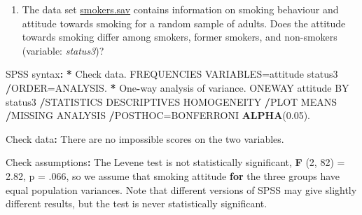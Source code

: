 \documentclass[a4paper]{book}
\newenvironment{Shaded}{\begin{snugshade}}{\end{snugshade}}
\newcommand{\KeywordTok}[1]{\textcolor[rgb]{0,0,0}{\textbf{#1}}}
\newcommand{\DecValTok}[1]{\textcolor[rgb]{0.00,0.00,0.00}{#1}}
\newcommand{\FloatTok}[1]{\textcolor[rgb]{0.00,0.00,0.00}{#1}}
\newcommand{\StringTok}[1]{\textcolor[rgb]{0.00,0.00,0.00}{#1}}
\newcommand{\ControlFlowTok}[1]{\textcolor[rgb]{0.00,0.00,0.00}{\textbf{#1}}}
\newcommand{\OperatorTok}[1]{\textcolor[rgb]{0.00,0.00,0.00}{\textbf{#1}}}
\newcommand{\ErrorTok}[1]{\textcolor[rgb]{0.00,0.00,0.00}{\textbf{#1}}}
\newcommand{\NormalTok}[1]{#1}
\providecommand{\tightlist}{%
  \setlength{\itemsep}{0pt}\setlength{\parskip}{0pt}}
\theoremstyle{definition}
\theoremstyle{definition}
\theoremstyle{definition}
\theoremstyle{remark}
\begin{document}
\begin{enumerate}
\def\labelenumi{\arabic{enumi}.}
\setcounter{enumi}{1}
\tightlist
\item
  The data set
  \href{http://82.196.4.233:3838/data/smokers.sav}{smokers.sav} contains
  information on smoking behaviour and attitude towards smoking for a
  random sample of adults. Does the attitude towards smoking differ
  among smokers, former smokers, and non-smokers (variable:
  \emph{status3})?
\end{enumerate}

\begin{Shaded}
\begin{Highlighting}[]
\NormalTok{SPSS syntax}\OperatorTok{:}\StringTok{  }
\StringTok{  }
\ErrorTok{*}\StringTok{ }\NormalTok{Check data.  }
\NormalTok{FREQUENCIES VARIABLES=attitude status3  }
  \OperatorTok{/}\NormalTok{ORDER=ANALYSIS.  }
\OperatorTok{*}\StringTok{ }\NormalTok{One}\OperatorTok{-}\NormalTok{way analysis of variance.  }
\NormalTok{ONEWAY attitude BY status3  }
  \OperatorTok{/}\NormalTok{STATISTICS DESCRIPTIVES HOMOGENEITY   }
  \OperatorTok{/}\NormalTok{PLOT MEANS  }
  \OperatorTok{/}\NormalTok{MISSING ANALYSIS  }
  \OperatorTok{/}\NormalTok{POSTHOC=BONFERRONI }\KeywordTok{ALPHA}\NormalTok{(}\FloatTok{0.05}\NormalTok{).  }
  
\NormalTok{Check data}\OperatorTok{:}\StringTok{  }
\StringTok{  }
\NormalTok{There are no impossible scores on the two variables.  }
  
\NormalTok{Check assumptions}\OperatorTok{:}\StringTok{  }
\StringTok{  }
\NormalTok{The Levene test is not statistically significant, }\KeywordTok{F}\NormalTok{ (}\DecValTok{2}\NormalTok{, }\DecValTok{82}\NormalTok{) =}\StringTok{ }\FloatTok{2.82}\NormalTok{, p =}\StringTok{ }\NormalTok{.}\DecValTok{066}\NormalTok{,}
\NormalTok{so we assume that smoking attitude }\ControlFlowTok{for}\NormalTok{ the three groups have equal population}
\NormalTok{variances. Note that different versions of SPSS may give slightly different}
\NormalTok{results, but the test is never statistically significant.}
  

\end{Highlighting}
\end{Shaded}
\end{document}
